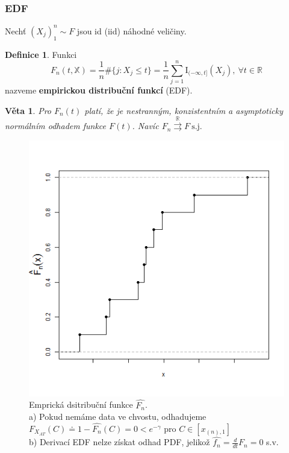 \documentclass{article}
\newtheorem{theorem}[subsubsection]{Věta}
\theoremstyle{remark}
\theoremstyle{plain}
\theoremstyle{definition}
\newtheorem{definition}[subsubsection]{Definice}
\theoremstyle{remark}
\begin{document}
\subsubsection{EDF}
Nechť $\left(X_j\right)_1^n \sim F$ jsou id (iid) náhodné veličiny.

\begin{definition}
Funkci
$$
F_n\left(t,\mathbb{X}\right) = \frac{1}{n} \#\{j:X_j \leq t\} = \frac{1}{n} \sum_{j=1}^{n} \text{I}_{(-\infty,t]}\left(X_j\right), \ \forall t \in \mathbb{R}
$$
nazveme \textbf{empirickou distribuční funkcí} (EDF).
\end{definition}

\begin{theorem}
Pro $F_n\left(t\right)$ platí, že je nestranným, konzistentním a asymptoticky normálním odhadem funkce $F\left(t\right)$. Navíc $F_n \overset{\mathbb{R}}{\rightrightarrows}F \ \text{s.j.}$
\end{theorem}

\begin{figure}[h]
    \centering
    \includegraphics[scale=0.8]{pics/EDF.png}
    \captionsetup{justification=centering}
    \caption{Emprická dsitribuční funkce $\hat{F_n}$. \\ 
    a) Pokud nemáme data ve chvostu, odhadujeme $F_{X_{AT}}(C) \doteq 1 - \hat{F_n}(C) = 0 < e^{-\gamma}$ pro $C \in [x_{(n),1}]$ \\
    b) Derivací EDF nelze získat odhad PDF, jelikož $\hat{f_n} = \frac{d}{dt}F_n = 0$ s.v.}
\end{figure}
\end{document}
